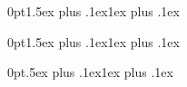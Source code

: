 \documentclass[letterpaper,twocolumn,10pt]{article}
\begin{document}
\titlespacing*{\section}
{0pt}{1.5ex plus .1ex}{1ex plus .1ex}

\titleformat{\subsection}[block]{
  \fontsize{12}{14}\bfseries}{%
  \thesubsection}{%
  1em}{%
  }{%
  }%
  
\titlespacing*{\subsection}
{0pt}{1.5ex plus .1ex}{1ex plus .1ex}

\titlespacing*{\paragraph}
{0pt}{.5ex plus .1ex}{1ex plus .1ex}


\setdefaultitem{\normalfont\bfseries\textendash}{}{}{}

\setdefaultleftmargin{1.5em}{3em}{}{}{}{}

\setlength{\abovecaptionskip}{3pt minus 1pt}
\setlength{\belowcaptionskip}{-7pt}




%





%





%

\balance


\end{document}
